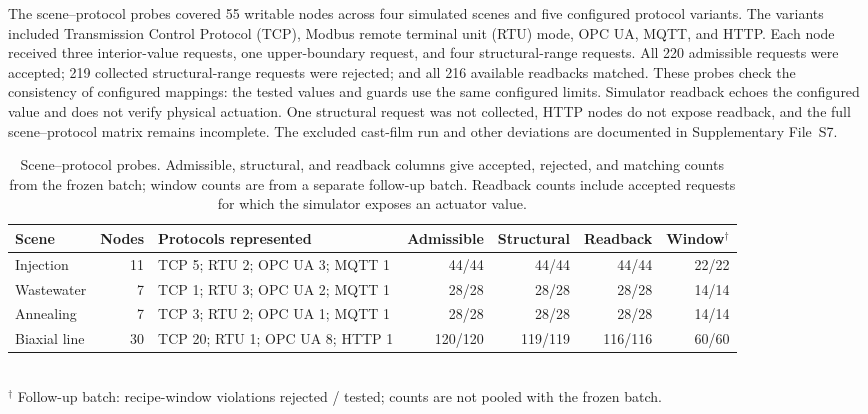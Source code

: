 The scene--protocol probes covered 55 writable nodes across four simulated scenes and five configured protocol variants. The variants included Transmission Control Protocol (TCP), Modbus remote terminal unit (RTU) mode, OPC UA, MQTT, and HTTP. Each node received three interior-value requests, one upper-boundary request, and four structural-range requests. All 220 admissible requests were accepted; 219 collected structural-range requests were rejected; and all 216 available readbacks matched. These probes check the consistency of configured mappings: the tested values and guards use the same configured limits. Simulator readback echoes the configured value and does not verify physical actuation. One structural request was not collected, HTTP nodes do not expose readback, and the full scene--protocol matrix remains incomplete. The excluded cast-film run and other deviations are documented in Supplementary File~S7.

\begin{table}[!t]
\centering
\caption{Scene--protocol probes. Admissible, structural, and readback columns give accepted, rejected, and matching counts from the frozen batch; window counts are from a separate follow-up batch. Readback counts include accepted requests for which the simulator exposes an actuator value.}
\label{tab:scene-probe-results}
\footnotesize
\setlength{\tabcolsep}{3pt}
\begin{tabularx}{\textwidth}{@{}>{\raggedright\arraybackslash}p{1.55cm}r X r r r r@{}}
\toprule
Scene & Nodes & Protocols represented & Admissible & Structural & Readback & Window$^{\dagger}$ \\
\midrule
Injection & 11 & TCP 5; RTU 2; OPC UA 3; MQTT 1 & 44/44 & 44/44 & 44/44 & 22/22 \\
Wastewater & 7 & TCP 1; RTU 3; OPC UA 2; MQTT 1 & 28/28 & 28/28 & 28/28 & 14/14 \\
Annealing & 7 & TCP 3; RTU 2; OPC UA 1; MQTT 1 & 28/28 & 28/28 & 28/28 & 14/14 \\
Biaxial line & 30 & TCP 20; RTU 1; OPC UA 8; HTTP 1 & 120/120 & 119/119 & 116/116 & 60/60 \\
\bottomrule
\end{tabularx}\\
{\footnotesize $^{\dagger}$ Follow-up batch: recipe-window violations rejected / tested; counts are not pooled with the frozen batch.}
\end{table}


